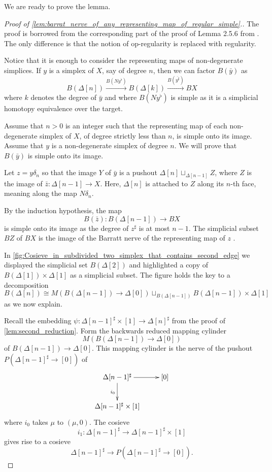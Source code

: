 We are ready to prove the lemma.
\begin{proof}[Proof of \cref{lem:barrat_nerve_of_any_representing_map_of_regular_simple}.]
The proof is borrowed from the corresponding part of the proof of Lemma 2.5.6 from \cite[p.~71]{WJR13}. The only difference is that the notion of op-regularity is replaced with regularity.

Notice that it is enough to consider the representing maps of non-degenerate simplices. If $y$ is a simplex of $X$, say of degree $n$, then we can factor $B(\bar{y} )$ as
\[B(\Delta [n])\xrightarrow{B(Ny^\flat )} B(\Delta [k])\xrightarrow{B(\overline{y^\sharp } )} BX\]
where $k$ denotes the degree of $\bar{y}$ and where $B(Ny^\flat )$ is simple as it is a simplicial homotopy equivalence over the target.

Assume that $n>0$ is an integer such that the representing map of each non-degenerate simplex of $X$, of degree strictly less than $n$, is simple onto its image. Assume that $y$ is a non-degenerate simplex of degree $n$. We will prove that $B(\bar{y} )$ is simple onto its image.

Let $z=y\delta _n$ so that the image $Y$ of $\bar{y}$ is a pushout $\Delta [n]\sqcup _{\Delta [n-1]}Z$, where $Z$ is the image of $\bar{z} :\Delta [n-1]\to X$. Here, $\Delta [n]$ is attached to $Z$ along its $n$-th face, meaning along the map $N\delta _n$.

By the induction hypothesis, the map
\[B(\bar{z} ):B(\Delta [n-1])\to BX\]
is simple onto its image as the degree of $z^\sharp$ is at most $n-1$. The simplicial subset $BZ$ of $BX$ is the image of the Barratt nerve of the representing map of $z$ \cite[Lem.~2.4.20]{WJR13}.

In \cref{fig:Cosieve_in_subdivided_two_simplex_that_contains_second_edge} we displayed the simplicial set $B(\Delta [2])$ and highlighted a copy of $B(\Delta [1])\times \Delta [1]$ as a simplicial subset. The figure holds the key to a decomposition
\[B(\Delta [n])\cong M(B(\Delta [n-1])\to \Delta [0])\sqcup _{B(\Delta [n-1])}B(\Delta [n-1])\times \Delta [1]\]
as we now explain.

Recall the embedding $\psi :\Delta [n-1]^\sharp \times [1]\to \Delta [n]^\sharp$ from the proof of \cref{lem:second_reduction}. Form the backwards reduced mapping cylinder
\[M(B(\Delta [n-1])\to \Delta [0])\]
of $B(\Delta [n-1])\to \Delta [0]$. This mapping cylinder is the nerve of the pushout $P(\Delta [n-1]^\sharp \to [0])$ of
\begin{displaymath}
\xymatrix{
\Delta [n-1]^\sharp \ar[d]_{i_0} \ar[r] & [0] \\
\Delta [n-1]^\sharp \times [1]
}
\end{displaymath}
where $i_0$ takes $\mu$ to $(\mu ,0)$. The cosieve
\[i_1:\Delta [n-1]^\sharp \to \Delta [n-1]^\sharp \times [1]\]
gives rise to a cosieve
\[\Delta [n-1]^\sharp \to P(\Delta [n-1]^\sharp \to [0]).\]


\end{proof}
